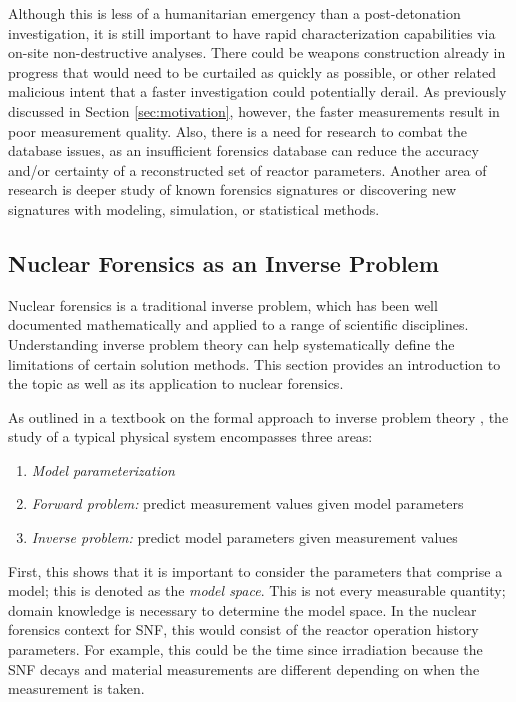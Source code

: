 Although this is less of a humanitarian emergency than a post-detonation
investigation, it is still important to have rapid characterization
capabilities via on-site non-destructive analyses.  There could be weapons
construction already in progress that would need to be curtailed as quickly as
possible, or other related malicious intent that a faster investigation could
potentially derail.  As previously discussed in Section \ref{sec:motivation},
however, the faster measurements result in poor measurement quality. Also,
there is a need for research to combat the database issues, as an insufficient
forensics database can reduce the accuracy and/or certainty of a reconstructed
set of reactor parameters.  Another area of research is deeper study of known
forensics signatures or discovering new signatures with modeling, simulation,
or statistical methods. 

\subsection{Nuclear Forensics as an Inverse Problem}
\label{sec:inverse}

Nuclear forensics is a traditional inverse problem, which has been well
documented mathematically and applied to a range of scientific disciplines.
Understanding inverse problem theory can help systematically define the
limitations of certain solution methods.  This section provides an introduction
to the topic as well as its application to nuclear forensics. 

As outlined in a textbook on the formal approach to inverse problem theory
\cite{inverse_theory}, the study of a typical physical system encompasses three
areas:
\begin{enumerate}
  \itemsep-0.75em
  \item \textit{Model parameterization}
  \item \textit{Forward problem:} predict measurement values given model parameters
  \item \textit{Inverse problem:} predict model parameters given measurement values
\end{enumerate}

First, this shows that it is important to consider the parameters that comprise
a model; this is denoted as the \textit{model space}. This is not every
measurable quantity; domain knowledge is necessary to determine the model
space. In the nuclear forensics context for \gls{SNF}, this would consist of
the reactor operation history parameters. For example, this could be the time
since irradiation because the \gls{SNF} decays and material measurements are
different depending on when the measurement is taken.

